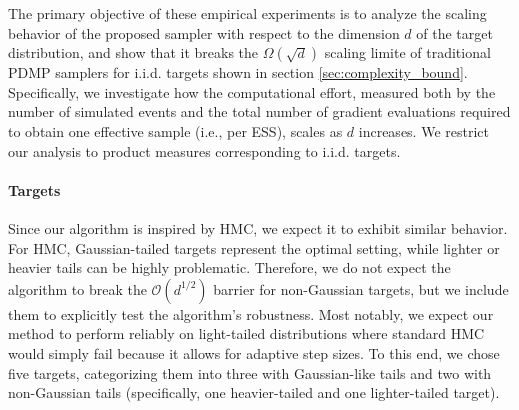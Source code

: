 \documentclass{article}
\begin{document}
The primary objective of these empirical experiments is to analyze the scaling behavior of the proposed sampler with respect to the dimension $d$ of the target distribution, and show that it breaks the $\Omega(\sqrt{d})$ scaling limite of traditional PDMP samplers for i.i.d. targets shown in section \ref{sec:complexity_bound}. Specifically, we investigate how the computational effort, measured both by the number of simulated events and the total number of gradient evaluations required to obtain one effective sample (i.e., per ESS), scales as $d$ increases. We restrict our analysis to product measures corresponding to i.i.d. targets.

\paragraph{Targets}
Since our algorithm is inspired by HMC, we expect it to exhibit similar behavior. For HMC, Gaussian-tailed targets represent the optimal setting, while lighter or heavier tails can be highly problematic. Therefore, we do not expect the algorithm to break the $\mathcal{O}(d^{1/2})$ barrier for non-Gaussian targets, but we include them to explicitly test the algorithm's robustness. Most notably, we expect our method to perform reliably on light-tailed distributions where standard HMC would simply fail because it allows for adaptive step sizes. To this end, we chose five targets, categorizing them into three with Gaussian-like tails and two with non-Gaussian tails (specifically, one heavier-tailed and one lighter-tailed target).
\end{document}
